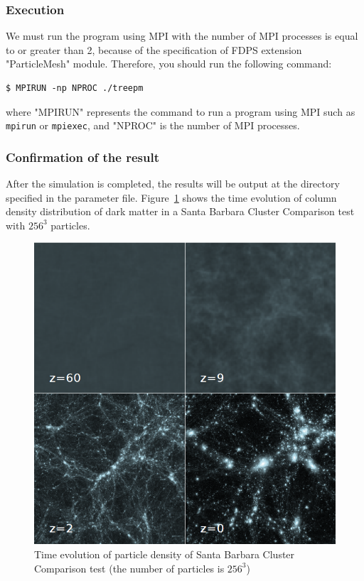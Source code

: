 \subsubsection{Execution}
We must run the program using MPI with the number of MPI processes is equal to or greater than 2, because of the specification of FDPS extension "ParticleMesh" module. Therefore, you should run the following command:
\begin{screen}
\begin{verbatim}
$ MPIRUN -np NPROC ./treepm
\end{verbatim}
\end{screen}
where "MPIRUN" represents the command to run a program using MPI such as \texttt{mpirun} or \texttt{mpiexec}, and "NPROC" is the number of MPI processes.

\subsubsection{Confirmation of the result}
After the simulation is completed, the results will be output at the directory specified in the parameter file.
Figure~\ref{fig:treepm} shows the time evolution of column density distribution of dark matter in a Santa Barbara Cluster Comparison test with $256^{3}$ particles.

\begin{figure}[h]
\centering
\includegraphics[width=0.666\linewidth]{./fig/sb256.png}
\caption{Time evolution of particle density of Santa Barbara Cluster Comparison test (the number of particles is $256^{3}$)}
\label{fig:treepm}
\end{figure}

\endifCpp %